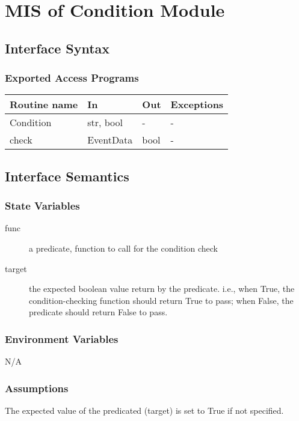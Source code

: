 \documentclass[12pt,titlepage]{article}
\begin{document}
\newpage
\section{MIS of Condition Module}

\subsection{Interface Syntax}
\subsubsection{Exported Access Programs}
\begin{tabular}{| l | l | l | p{6cm} |}
  \hline
  \textbf{Routine name} & \textbf{In} & \textbf{Out} & \textbf{Exceptions}\\
  \hline
  Condition & str, bool & - & - \\
  check & EventData & bool & - \\
  \hline
\end{tabular}

\subsection{Interface Semantics}
\subsubsection{State Variables}

\begin{description}
\item[func] a predicate, function to call for the condition check
\item[target] the expected boolean value return by the predicate. i.e., when True,
  the condition-checking function should return True to pass; when False, the
  predicate should return False to pass.
\end{description}

\subsubsection{Environment Variables}

N/A

\subsubsection{Assumptions}

The expected value of the predicated (target) is set to True if not specified.
\end{document}
